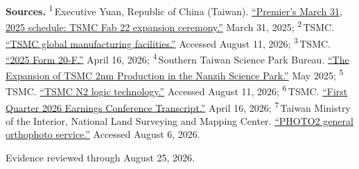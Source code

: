 \begin{minipage}[t][0.90\textheight][t]{\textwidth}
{\sffamily\scriptsize\setlength{\emergencystretch}{1.5em}\textbf{Sources.} \textsuperscript{1}\,Executive Yuan, Republic of China (Taiwan). \href{\detokenize{https://www.ey.gov.tw/Page/278197D37F0FCDA?ED=20250331&K=&SD=20250331&T=1&page=1}}{\enquote{Premier's March 31, 2025 schedule: TSMC Fab 22 expansion ceremony.}} March 31, 2025; \textsuperscript{2}\,TSMC. \href{\detokenize{https://www.tsmc.com/english/aboutTSMC/TSMC_Fabs}}{\enquote{TSMC global manufacturing facilities.}} Accessed August 11, 2026; \textsuperscript{3}\,TSMC. \href{\detokenize{https://investor.tsmc.com/sites/ir/sec-filings/2025_20F}\%\detokenize{20Report.pdf}}{\enquote{2025 Form 20-F.}} April 16, 2026; \textsuperscript{4}\,Southern Taiwan Science Park Bureau. \href{\detokenize{https://www.stsp.gov.tw/attached/Letter/Ebook/316/files/basic-html/page5.html}}{\enquote{The Expansion of TSMC 2nm Production in the Nanzih Science Park.}} May 2025; \textsuperscript{5}\,TSMC. \href{\detokenize{https://www.tsmc.com/english/dedicatedFoundry/technology/logic/l_2nm}}{\enquote{TSMC N2 logic technology.}} Accessed August 11, 2026; \textsuperscript{6}\,TSMC. \href{\detokenize{https://investor.tsmc.com/chinese/encrypt/files/encrypt_file/reports/2026-04/3cef85204275f94fd111485cfdf4adb3c0263c45/TSMC}\%\detokenize{201Q26}\%\detokenize{20Transcript.pdf}}{\enquote{First Quarter 2026 Earnings Conference Transcript.}} April 16, 2026; \textsuperscript{7}\,Taiwan Ministry of the Interior, National Land Surveying and Mapping Center. \href{\detokenize{https://maps.nlsc.gov.tw/S09SOA/pro/Wms_ajax_list.jsp}}{\enquote{PHOTO2 general orthophoto service.}} Accessed August 6, 2026.\par}
\vfill
\noindent{\color{hairline}\rule{\linewidth}{0.4pt}}\par\smallskip
{\sffamily\scriptsize\color{black!58} Evidence reviewed through August 25, 2026.\par}
\end{minipage}
\clearpage

